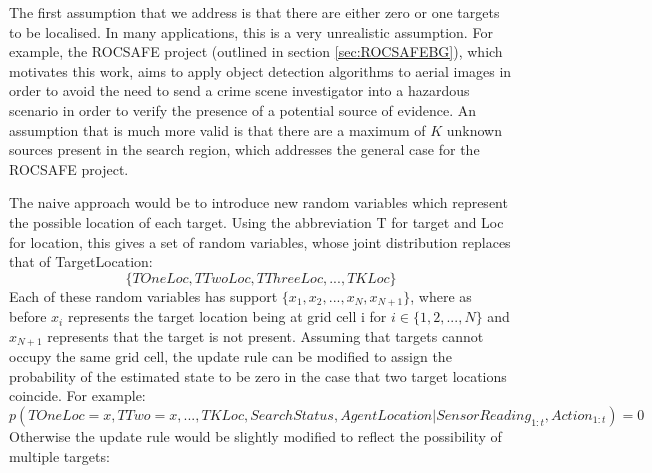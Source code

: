 The first assumption that we address is that there are either zero or one targets to be localised. In many applications, this is a very unrealistic assumption. For example, the ROCSAFE project (outlined in section \ref{sec:ROCSAFEBG}), which motivates this work, aims to apply object detection algorithms to aerial images in order to avoid the need to send a crime scene investigator into a hazardous scenario in order to verify the presence of a potential source of evidence. An assumption that is much more valid is that there are a maximum of $K$ unknown sources present in the search region, which addresses the general case for the ROCSAFE  project.\par

The naive approach would be to introduce new random variables which represent the possible location of each target. Using the abbreviation T for target and Loc for location, this gives a set of random variables, whose joint distribution replaces that of TargetLocation: \[\{TOneLoc, TTwoLoc, TThreeLoc,...,TKLoc\}\] Each of these random variables has support $\{x_1, x_2, ..., x_N, x_{N+1}\}$, where as before $x_i$ represents the target location being at grid cell i for $i \in \{1,2, ..., N\}$ and $x_{N+1}$ represents that the target is not present. 
Assuming that targets cannot occupy the same grid cell, the update rule can be modified to assign the probability of the estimated state to be zero in the case that two target locations coincide. For example:
\footnotesize{
\[p(TOneLoc = x, TTwo = x, ..., TKLoc, SearchStatus, AgentLocation | SensorReading_{1:t}, Action_{1:t}) = 0\]}
Otherwise the update rule would be slightly modified to reflect the possibility of multiple targets: 


